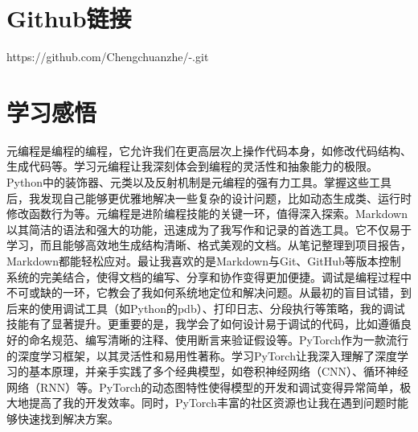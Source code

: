 \documentclass[a4paper, 12pt]{article}
\begin{document}
\section{Github链接}
https://github.com/Chengchuanzhe/-.git
\section{学习感悟}
    元编程是编程的编程，它允许我们在更高层次上操作代码本身，如修改代码结构、生成代码等。学习元编程让我深刻体会到编程的灵活性和抽象能力的极限。Python中的装饰器、元类以及反射机制是元编程的强有力工具。掌握这些工具后，我发现自己能够更优雅地解决一些复杂的设计问题，比如动态生成类、运行时修改函数行为等。元编程是进阶编程技能的关键一环，值得深入探索。Markdown以其简洁的语法和强大的功能，迅速成为了我写作和记录的首选工具。它不仅易于学习，而且能够高效地生成结构清晰、格式美观的文档。从笔记整理到项目报告，Markdown都能轻松应对。最让我喜欢的是Markdown与Git、GitHub等版本控制系统的完美结合，使得文档的编写、分享和协作变得更加便捷。调试是编程过程中不可或缺的一环，它教会了我如何系统地定位和解决问题。从最初的盲目试错，到后来的使用调试工具（如Python的pdb）、打印日志、分段执行等策略，我的调试技能有了显著提升。更重要的是，我学会了如何设计易于调试的代码，比如遵循良好的命名规范、编写清晰的注释、使用断言来验证假设等。PyTorch作为一款流行的深度学习框架，以其灵活性和易用性著称。学习PyTorch让我深入理解了深度学习的基本原理，并亲手实践了多个经典模型，如卷积神经网络（CNN）、循环神经网络（RNN）等。PyTorch的动态图特性使得模型的开发和调试变得异常简单，极大地提高了我的开发效率。同时，PyTorch丰富的社区资源也让我在遇到问题时能够快速找到解决方案。
\end{document}
